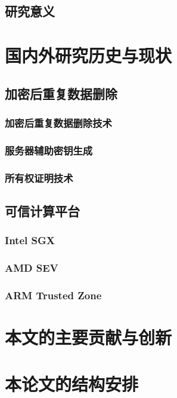 \subsection{研究意义}

\section{国内外研究历史与现状}

\subsection{加密后重复数据删除}
\subsubsection{加密后重复数据删除技术}
\subsubsection{服务器辅助密钥生成}
\subsubsection{所有权证明技术}
\subsection{可信计算平台}
\subsubsection{Intel SGX}
\subsubsection{AMD SEV}
\subsubsection{ARM Trusted Zone}


\section{本文的主要贡献与创新}

\section{本论文的结构安排}